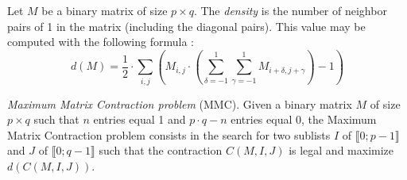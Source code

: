 \begin{definition}
	Let $M$ be a binary matrix of size $p \times q$. The \emph{density} is the number of neighbor pairs of 1 in the matrix (including the diagonal pairs). This value may be computed with the following formula :
	$$ 
	d(M) = \frac{1}{2} \cdot \sum\limits_{i,j} \left( M_{i,j} \cdot \left(\sum\limits_{\delta = -1}^1 \sum\limits_{\gamma = -1}^1  M_{i+\delta,j+\gamma}\right) - 1 \right)
	$$
\end{definition}

\begin{problem}
	\emph{Maximum Matrix Contraction problem} (MMC). Given a binary matrix $M$ of size $p \times q$ such that $n$ entries equal 1 and $p \cdot q - n$ entries equal 0, the Maximum Matrix Contraction problem consists in the search for two sublists $I$ of $\llbracket 0;p-1 \rrbracket$ and $J$ of $\llbracket 0;q-1 \rrbracket$ such that the contraction $C(M,I,J)$ is legal and maximize $d(C(M,I,J))$.
\end{problem}

\begin{comment}
Doit-on parler du programme mathématique trivial ici?
\end{comment}


